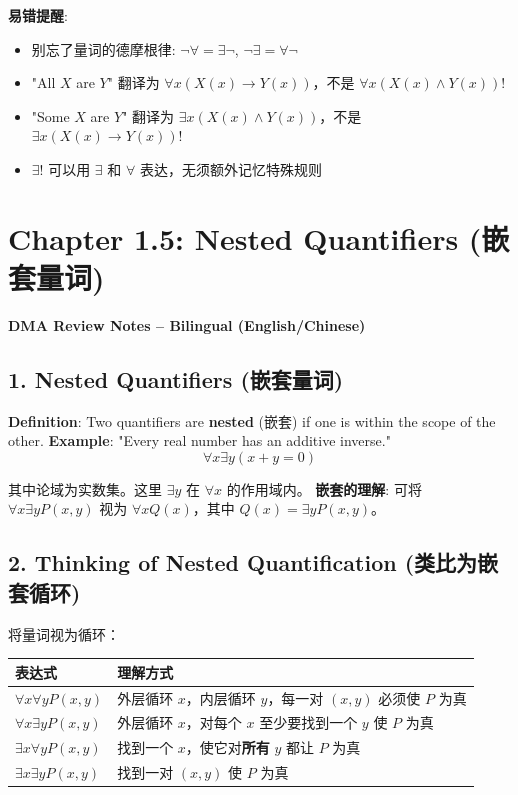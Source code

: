 \documentclass[10pt,a4paper,openany]{ctexbook}
\theoremstyle{definition}
\theoremstyle{remark}
\renewenvironment{quote}
  {\list{}{\leftmargin=1em\rightmargin=0pt\topsep=0.5pt\partopsep=0pt}\item[]}
  {\endlist}
\begin{document}
\textbf{易错提醒}:
\begin{itemize}
\item 别忘了量词的德摩根律: $\neg \forall = \exists \neg$, $\neg \exists = \forall \neg$
\item "All $X$ are $Y$" 翻译为 $\forall x (X(x) \to Y(x))$，不是 $\forall x (X(x) \land Y(x))$!
\item "Some $X$ are $Y$" 翻译为 $\exists x (X(x) \land Y(x))$，不是 $\exists x (X(x) \to Y(x))$!
\item $\exists!$ 可以用 $\exists$ 和 $\forall$ 表达，无须额外记忆特殊规则

\end{itemize}


\section{Chapter 1.5: Nested Quantifiers (嵌套量词)}

\begin{quote}
\textbf{DMA Review Notes -- Bilingual (English/Chinese)}

\end{quote}
\vspace{-2pt}

\subsection{1. Nested Quantifiers (嵌套量词)}

\textbf{Definition}: Two quantifiers are \textbf{nested} (嵌套) if one is within the scope of the other.
\textbf{Example}: "Every real number has an additive inverse."
\[
\forall x \exists y (x + y = 0)
\]

其中论域为实数集。这里 $\exists y$ 在 $\forall x$ 的作用域内。
\textbf{嵌套的理解}: 可将 $\forall x \exists y P(x,y)$ 视为 $\forall x Q(x)$，其中 $Q(x) = \exists y P(x,y)$。
\vspace{-2pt}

\subsection{2. Thinking of Nested Quantification (类比为嵌套循环)}

将量词视为循环：
\begin{center}
\begin{tabular}{ll}
\hline
表达式 & 理解方式 \\ \hline
$\forall x \forall y P(x,y)$ & 外层循环 $x$，内层循环 $y$，每一对 $(x,y)$ 必须使 $P$ 为真 \\
$\forall x \exists y P(x,y)$ & 外层循环 $x$，对每个 $x$ 至少要找到一个 $y$ 使 $P$ 为真 \\
$\exists x \forall y P(x,y)$ & 找到一个 $x$，使它对\textbf{所有} $y$ 都让 $P$ 为真 \\
$\exists x \exists y P(x,y)$ & 找到一对 $(x,y)$ 使 $P$ 为真 \\
\hline
\end{tabular}

\end{center}
\end{document}
